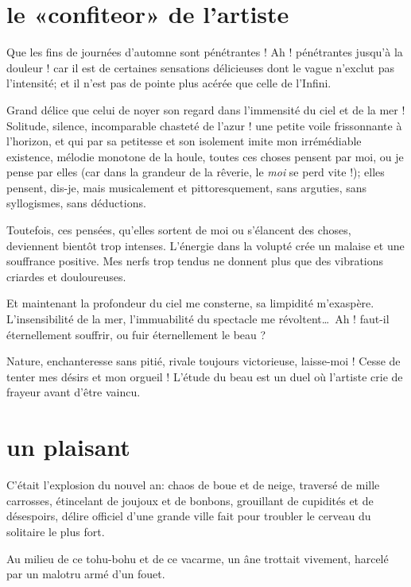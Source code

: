 \quebra\section[Le «confiteor» de l’artiste]{le «confiteor» de l’artiste}

Que les fins de journées d’automne sont pénétrantes !
Ah ! pénétrantes jusqu’à la douleur ! car il est de
certaines sensations délicieuses dont le vague
n’exclut pas l’intensité; et il
n’est pas de pointe plus acérée que celle de
l’Infini.

Grand délice que celui de noyer son regard dans
l’immensité du ciel et de la mer ! Solitude, silence,
incomparable chasteté de l’azur ! une petite voile
frissonnante à l’horizon, et qui par sa petitesse et
son isolement imite mon irrémédiable existence, mélodie monotone de la
houle, toutes ces choses pensent par moi, ou je pense par elles (car
dans la grandeur de la rêverie, le \textit{moi} se perd vite !); elles pensent,
dis{}-je, mais musicalement et pittoresquement, sans arguties, sans
syllogismes, sans déductions.

Toutefois, ces pensées, qu’elles sortent de moi ou
s’élancent des choses, deviennent bientôt trop
intenses. L’énergie dans la volupté crée un malaise et
une souffrance positive. Mes nerfs trop tendus ne donnent plus que des
vibrations criardes et douloureuses.

Et maintenant la profondeur du ciel me consterne, sa limpidité
m’exaspère. L’insensibilité de la
mer, l’immuabilité du spectacle me révoltent\ldots\ Ah !
faut{}-il éternellement souffrir, ou fuir éternellement le beau ?

Nature, enchanteresse sans pitié, rivale toujours victorieuse,
laisse{}-moi ! Cesse de tenter mes désirs et mon orgueil !
L’étude du beau est un duel où
l’artiste crie de frayeur avant
d’être vaincu.

\quebra\section[Un plaisant]{un plaisant} 

C’était l’explosion du nouvel an:
chaos de boue et de neige, traversé de mille carrosses, étincelant de
joujoux et de bonbons, grouillant de cupidités et de désespoirs, délire
officiel d’une grande ville fait pour troubler le
cerveau du solitaire le plus fort.

Au milieu de ce tohu{}-bohu et de ce vacarme, un âne trottait vivement,
harcelé par un malotru armé d’un fouet.

